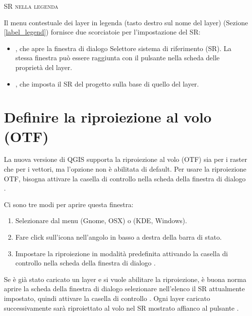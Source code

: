 \begin{Tip}
\caption{\textsc{SR nella legenda}} Il menu contestuale dei layer in legenda (tasto destro sul nome del layer) 
(Sezione \ref{label_legend}) fornisce due scorciatoie per l'impostazione del SR:
\begin{itemize}
\item {}, che apre la finestra di dialogo Selettore sistema di riferimento (SR). 
La stessa finestra può essere raggiunta con il pulsante  nella scheda  delle proprietà del layer.
\item {}, che imposta il SR del progetto sulla base di quello del layer.
\end{itemize}
\end{Tip}

\section{Definire la riproiezione al volo (OTF)}\label{label_projstart}

La nuova versione di QGIS supporta la riproiezione al volo (OTF) sia per i raster che per i vettori, ma l'opzione non 
è abilitata di default. Per usare la riproiezione OTF, bisogna attivare la casella di controllo 
 nella scheda  della finestra di dialogo 
.

Ci sono tre modi per aprire questa finestra:

\begin{enumerate}
\item Selezionare  dal menu
 (Gnome, OSX) o  (KDE, Windows).
\item Fare click sull'icona  nell'angolo 
in basso a destra della barra di stato.
\item Impostare la riproiezione in modalità predefinita attivando la casella di controllo 
 nella scheda  della finestra di 
dialogo .
\end{enumerate}

Se è già stato caricato un layer e si vuole abilitare la riproiezione, è buona norma aprire
la scheda  della finestra di dialogo 
 selezionare nell'elenco il SR attualmente impostato, 
quindi attivare la casella di controllo .
Ogni layer caricato successivamente sarà riproiettato al volo nel SR mostrato affianco al
pulsante .

